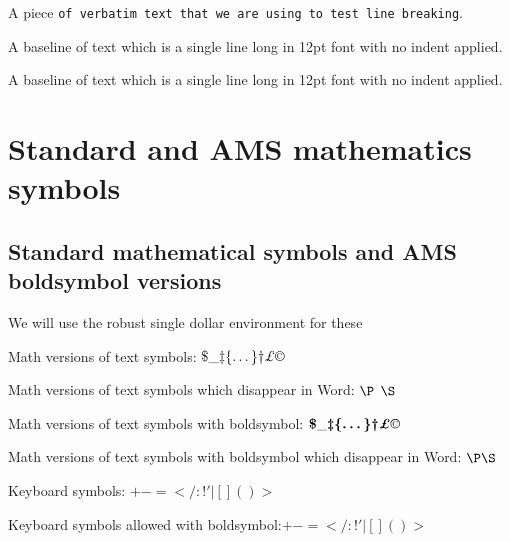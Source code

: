 \documentclass[12pt,a4paper]{article}
\theoremstyle{clearprint}
\begin{document}
\bigskip
A piece \verb=of verbatim text that we are using to test line breaking=.


\bigskip

\noindent
A baseline of text which is a single line long in 12pt font with no indent applied.

\vspace{4\baselineskip}

\noindent
A baseline of text which is a single line long in 12pt font with no indent applied.\marginpar{\rule[-1ex]{0.3em}{4ex}}

\newpage

\section[Standard/AMS maths symbols]{Standard and AMS mathematics symbols}
\setcounter{equation}{0}

\subsection[Standard/AMS normal/bold symbols]{Standard mathematical symbols\label{maths-symbols} and AMS boldsymbol versions}\setcounter{equation}{0}

We will use the robust single dollar environment for these

Math versions of text symbols: $\$  \_  \ddag  \{  \dots  \}  \dag  \pounds \copyright$

Math versions of text symbols which disappear in Word: $\P$  $\S$

Math versions of text symbols with boldsymbol: $\boldsymbol{\$  \_  \ddag  \{  \dots  \}  \dag  \pounds \copyright}$

Math versions of text symbols with boldsymbol which disappear in Word: $\boldsymbol{\P  \S}$

Keyboard symbols: $+  -  =  <   /  :  !  '  |  [  ]  (  ) > $ 

Keyboard symbols allowed with boldsymbol:$ \boldsymbol{+  -  =  <   /  :  !  '  |  [  ]  (  ) > }$ 
\end{document}
